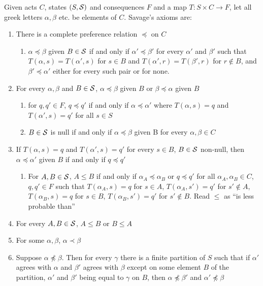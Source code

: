 Given acts $C$, states $(S,\mathcal{S})$ and consequences $F$ and a map $T:S\times C\to F$, let all greek letters $\alpha,\beta$ etc. be elements of $C$. Savage's axioms are:
\begin{enumerate}[P1:]
    \item There is a complete preference relation $\preceq$ on $C$
    \begin{enumerate}[D1:]
        \item $\alpha\preceq \beta$ given $B\in \mathcal{S}$ if and only if $\alpha'\preceq \beta'$ for every $\alpha'$ and $\beta'$ such that $T(\alpha,s)=T(\alpha',s)$ for $s\in B$ and $T(\alpha',r)=T(\beta',r)$ for $r\not\in B$, and $\beta'\preceq \alpha'$ either for every such pair or for none.
    \end{enumerate}
    \item For every $\alpha,\beta$ and $B\in \mathcal{S}$, $\alpha\preceq \beta$ given $B$ or $\beta\preceq \alpha$ given $B$
    \begin{enumerate}[D2:]
        \item for $q,q'\in F$, $q\preceq q'$ if and only if $\alpha\preceq \alpha'$ where $T(\alpha,s)=q$ and $T(\alpha',s)=q'$ for all $s\in S$
        \item $B\in \mathcal{S}$ is null if and only if $\alpha\preceq \beta$ given B for every $\alpha,\beta\in C$
    \end{enumerate}
    \item If $T(\alpha,s)=q$ and $T(\alpha',s)=q'$ for every $s\in B$, $B\in \mathcal{S}$ non-null, then $\alpha\preceq \alpha'$ given $B$ if and only if $q\preceq q'$
    \begin{enumerate}[D4:]
        \item For $A,B\in \mathcal{S}$, $A\leqslant B$ if and only if $\alpha_A\preceq \alpha_B$ or $q\preceq q'$ for all $\alpha_A,\alpha_B\in C$, $q,q'\in F$ such that $T(\alpha_A,s) = q$ for $s\in A$, $T(\alpha_A,s')=q'$ for $s'\not\in A$, $T(\alpha_B,s)=q$ for $s\in B$, $T(\alpha_B,s')=q'$ for $s'\not\in B$. Read $\leqslant$ as ``is less probable than''
    \end{enumerate}
    \item For every $A,B\in\mathcal{S}$, $A\leqslant B$ or $B\leqslant A$
    \item For some $\alpha,\beta$, $\alpha\prec \beta$
    \item Suppose $\alpha\not\preceq \beta$. Then for every $\gamma$ there is a finite partition of $S$ such that if $\alpha'$ agrees with $\alpha$ and $\beta'$ agrees with $\beta$ except on some element $B$ of the partition, $\alpha'$ and $\beta'$ being equal to $\gamma$ on $B$, then $\alpha\not\preceq \beta'$ and $\alpha'\not\preceq \beta$

\end{enumerate}

